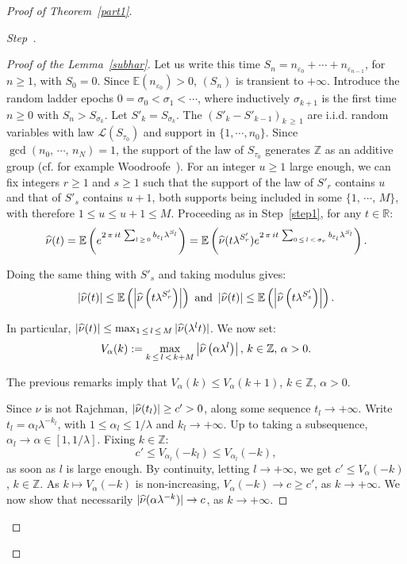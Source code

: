 \documentclass[AHL,Unicode,longabstracts,published]{cedram}
\newcommand{\Ebb}{\mathbb E}
\newcommand{\Rbb}{\mathbb R}
\newcommand{\Zbb}{\mathbb Z}
\newcommand{\Lcl}{\mathcal{L}}
\newcounter{stepcount}
\newenvironment{step}{\refstepcounter{stepcount}\begin{proof}[Step~\thestepcount]}{\let\qed\relax\end{proof}}
\let\oldhat\hat
\renewcommand*{\hat}[1]{\mathchoice{\widehat{#1}}{\widehat{#1}}{\oldhat{#1}}{\oldhat{#1}}}
\begin{document}
\begin{proof}[{Proof of Theorem~\ref{part1}}]
\begin{step}
\begin{proof}[{Proof of the Lemma~\ref{subhar}}]
Let us write this time $S_n=n_{\varepsilon_0}+\cdots+n_{\varepsilon_{n-1}}$, for $n\geq1$, with $S_0=0$. Since $\Ebb(n_{\varepsilon_0})>0$, $(S_n)$ is transient to $+\infty$. Introduce the random ladder epochs $0=\sigma_0<\sigma_1<\cdots$, where inductively $\sigma_{k+1}$ is the first time $n\geq0$ with $S_n>S_{\sigma_{k}}$. Let $S'_k=S_{\sigma_{k}}$. The $(S'_k-S'_{k-1})_{k\,\geq\,1}$ are i.i.d. random variables with law ${\Lcl}(S_{\tau_0})$ and support in $\{1,\cdots,n_0\}$. Since $\gcd(n_0,\,\cdots,\,n_N)=1$, the support of the law of $S_{\tau_0}$ generates $\Zbb$ as an additive group (cf. for example Woodroofe~\cite[Theorem~2.3, second~part]{wood}). For an integer $u\geq1$ large enough, we can fix integers $r\geq1$ and $s\geq1$ such that the support of the law of $S'_r$ contains $u$ and that of $S'_s$ contains $u+1$, both supports being included in some $\{1,\,\cdots,\,M\}$, with therefore $1\leq u\leq u+1\leq M$. Proceeding as in Step~\ref{step1}, for any $t\in\Rbb$:
\[
\hat{\nu}(t)=\Ebb\left({e^{2\,\pi\,it\,\sum_{l\,\geq\,0}b_{\varepsilon_l}\lambda^{S_l}}}\right)=\Ebb\left({\hat{\nu}(t\lambda^{S'_{r}})e^{2\,\pi\,it\,\sum_{0\,\leq\,l\,<\,\sigma_r}b_{\varepsilon_l}\lambda^{S_l}}}\right).
\]

Doing the same thing with $S'_s$ and taking modulus gives:
\begin{equation}\label{itera}
\left|\hat{\nu}(t)\right|\leq\Ebb\left({\left|\hat{\nu}\left(t\lambda^{S'_{r}}\right)\right|}\right)\text{ and }\left|\hat{\nu}(t)\right|\leq\Ebb\left({\left|\hat{\nu}\left(t\lambda^{S'_{s}}\right)\right|}\right).
\end{equation}

In particular, $|\hat{\nu}(t)|\leq\max_{1\,\leq\,l\,\leq \,M}|\hat{\nu}(\lambda^lt)|$. We now set:
\[
V_{\alpha}(k):=\max_{k\,\leq\,l\,<\,k+M}\left|\hat{\nu}\left(\alpha\lambda^l\right)\right|,\,k\in\Zbb,\,\alpha>0.
\]

The previous remarks imply that $V_{\alpha}(k)\leq V_{\alpha}(k+1)$, $k\in\Zbb$, $\alpha>0$.

Since $\nu$ is not Rajchman, $|\hat{\nu}(t_l)|\geq c'>0$, along some sequence $t_l\rightarrow+\infty$. Write $t_l=\alpha_l\lambda^{-k_l}$, with $1\leq \alpha_l\leq 1/\lambda$ and $k_l\rightarrow+\infty$. Up to taking a subsequence, $\alpha_l\rightarrow\alpha\in[1,1/\lambda]$. Fixing $k\in\Zbb$:
\[
c'\leq V_{\alpha_l}(-k_l)\leq V_{\alpha_l}(-k),
\]
as soon as $l$ is large enough. By continuity, letting $l\rightarrow+\infty$, we get $c'\leq V_{\alpha}(-k)$, $k\in\Zbb$. As $k\longmapsto V_{\alpha}(-k)$ is non-increasing, $V_{\alpha}(-k)\rightarrow c\geq c'$, as $k\rightarrow+\infty$. We now show that necessarily $|\hat{\nu}(\alpha\lambda^{-k})|\rightarrow c$, as $k\rightarrow+\infty$.


\end{proof}
\end{step}
\end{proof}
\end{document}
